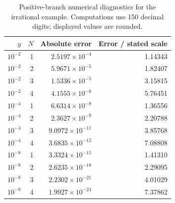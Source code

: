 \begin{table}[htbp]
\centering\small
\begin{tabular}{rrrr}
\toprule
$y$ & $N$ & Absolute error & Error / stated scale \\
\midrule
$10^{-2}$ & 1 & $2.5197\times10^{-4}$ & 1.14343 \\
$10^{-2}$ & 2 & $5.9671\times10^{-5}$ & 1.82407 \\
$10^{-2}$ & 3 & $1.5336\times10^{-5}$ & 3.15815 \\
$10^{-2}$ & 4 & $4.1555\times10^{-6}$ & 5.76451 \\
$10^{-4}$ & 1 & $6.6314\times10^{-8}$ & 1.36556 \\
$10^{-4}$ & 2 & $2.3627\times10^{-9}$ & 2.20788 \\
$10^{-4}$ & 3 & $9.0972\times10^{-11}$ & 3.85768 \\
$10^{-4}$ & 4 & $3.6835\times10^{-12}$ & 7.08808 \\
$10^{-8}$ & 1 & $3.3324\times10^{-15}$ & 1.41310 \\
$10^{-8}$ & 2 & $2.6235\times10^{-18}$ & 2.29095 \\
$10^{-8}$ & 3 & $2.2302\times10^{-21}$ & 4.01029 \\
$10^{-8}$ & 4 & $1.9927\times10^{-24}$ & 7.37862 \\
\bottomrule
\end{tabular}
\caption{Positive-branch numerical diagnostics for the irrational example. Computations use 150 decimal digits; displayed values are rounded.}
\label{tab:irrnumeric}
\end{table}
